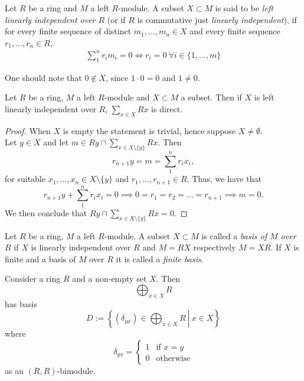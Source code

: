 \begin{definition}
    Let $R$ be a ring and $M$ a left $R$-module. A subset $X\subset M$ is said to be \textit{left linearly independent over $R$} (or if $R$ is commutative just \textit{linearly independent}), if for every finite sequence of distinct $m_1,\dots,m_n\in X$ and every finite sequence $r_1,\dots,r_n\in R$, 
    \begin{gather*}
        \sum_1^n r_im_i = 0 \iff r_i = 0\ \forall i\in \{1,\dots,m\}
    \end{gather*}
\end{definition}
\begin{remark}
    One should note that $0\notin X$, since $1\cdot 0 = 0$ and $1\neq 0$.
\end{remark}
\begin{proposition}
    Let $R$ be a ring, $M$ a left $R$-module and $X\subset M$ a subset. Then if $X$ is left linearly independent over $R$, $\sum_{x\in X} Rx$ is direct. 
\end{proposition}
\begin{proof}
    When $X$ is empty the statement is trivial, hence suppose $X\neq \emptyset$.\\ 
    Let $y\in X$ and let $m\in Ry \cap \sum_{x\in X\setminus \{y\}} Rx$. Then 
    $$r_{n+1} y = m = \sum_1^n r_i x_i,$$
    for suitable $x_1,\dots,x_n\in X\setminus\{y\}$ and $r_1,\dots,r_{n+1}\in R$. Thus, we have that 
    $$r_{n+1}y + \sum_1^n r_ix_i = 0 \implies 0=r_1=r_2=\dots=r_{n+1} \implies m = 0.$$
    We then conclude that $Ry\cap \sum_{x\in X\setminus\{y\}} Rx = 0$.
\end{proof}
\begin{definition}
    Let $R$ be a ring, $M$ a left $R$-module. A subset $X\subset M$ is called a \textit{basis of $M$ over $R$} if $X$ is linearly independent over $R$ and $M= RX$ respectively $M=XR$. If $X$ is finite and a basis of $M$ over $R$ it is called a \textit{finite basis}.
\end{definition}
\begin{lemma}\label{BasisOfDirectSum}
    Consider a ring $R$ and a non-empty set $X$. Then 
    $$
        \bigoplus_{x\in X} R
    $$
    has basis 
    $$
        D:=\left.\left\{ (\delta_{yx})\in \bigoplus_{x\in X} R \ \right| \ x\in X\right\}
    $$
    where 
    $$
         \delta_{yx} = 
        \begin{cases}
            1 & \text{if } x=y \\
            0 & \text{otherwise}
        \end{cases}
    $$
    as an $(R,R)$-bimodule. 
\end{lemma}
